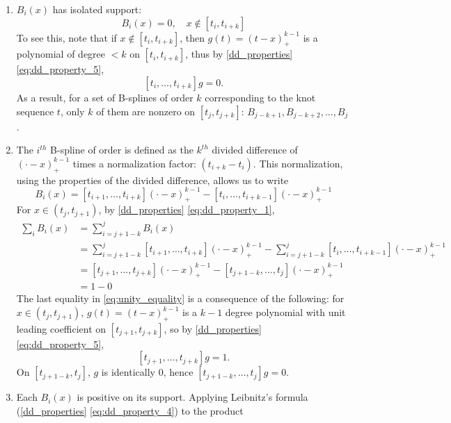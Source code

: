 \begin{enumerate} \label{eq:BS_properties}
\item \label{eq:BS_property_1} $B_i\left(x\right)$ has isolated support:
\[
B_i\left(x\right) = 0, \quad x \not \in \left[t_{i},t_{i+k}\right]
\]
To see this, note that if $x \not \in \left[t_{i},t_{i+k}\right]$, then $g\left(t \right) = \left(t-x\right)^{k-1}_+$ is a polynomial of degree $< k$ on $\left[t_{i},t_{i+k}\right]$, thus by \ref{dd_properties} \ref{eq:dd_property_5},
\[
\left[t_{i},\dots,t_{i+k}\right]g = 0.
\]
As a result, for a set of B-splines of order $k$ corresponding to the knot sequence $t$, only $k$ of them are nonzero on $\left[t_{j},t_{j+k}\right]$: $B_{j-k+1},B_{j-k+2},\dots,B_{j}$.
\item \label{eq:BS_property_2} The $i^{th}$ B-spline of order is defined as the $k^{th}$ divided difference of $\left(\cdot - x\right)_+^{k-1}$ times a normalization factor: $\left(t_{i+k}-t_i\right)$. This normalization, using the properties of the divided difference, allows us to write 
\begin{equation} \label{eq:BS_norm_rr}
B_i\left(x\right)=\left[t_{i+1},\dots,t_{i+k} \right]\left(\cdot - x\right)_+^{k-1} - \left[t_{i},\dots,t_{i+k-1} \right]\left(\cdot - x\right)_+^{k-1}
\end{equation}
For $x \in \left(t_{j},t_{j+1}\right)$, by \ref{dd_properties} \ref{eq:dd_property_1},
\begin{align}
\sum_{i} B_i\left(x\right) &=  \sum_{i=j+1-k}^{j} B_i\left(x\right) \nonumber\\
&= \sum_{i=j+1-k}^{j} \left[t_{i+1},\dots,t_{i+k} \right] \left(\cdot - x\right)_+^{k-1} - \sum_{i=j+1-k}^{j} \left[t_{i},\dots,t_{i+k-1} \right] \left(\cdot - x\right)_+^{k-1} \nonumber \\
&= \left[t_{j+1},\dots,t_{j+k} \right] \left(\cdot - x\right)_+^{k-1} - \left[t_{j+1-k},\dots,t_{j} \right] \left(\cdot - x\right)_+^{k-1} \nonumber \\
&= 1 - 0 \label{eq:unity_equality}
\end{align}
The last equality in \ref{eq:unity_equality} is a consequence of the following: for $x \in \left(t_j,t_{j+1}\right)$, $g\left(t\right)=\left(t - x\right)_+^{k-1}$ is a $k-1$ degree polynomial with unit leading coefficient on $\left[ t_{j+1},t_{j+k} \right]$, so by \ref{dd_properties} \ref{eq:dd_property_5}, 
\[
\left[ t_{j+1},\dots,t_{j+k} \right]g=1.
\]
On $\left[ t_{j+1-k},t_{j} \right]$, $g$ is identically $0$, hence $\left[ t_{j+1-k},\dots,t_{j} \right]g = 0$.   
\item \label{eq:BS_property_3}Each $B_i\left(x\right)$ is positive on its support. Applying Leibnitz's formula (\ref{dd_properties} \ref{eq:dd_property_4}) to the product

\end{enumerate}
